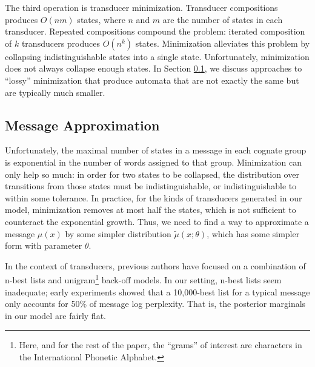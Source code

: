 \documentclass[11pt,a4paper]{article}
\begin{document}
The third operation is transducer minimization. Transducer compositions
produces $O(nm)$ states, where $n$ and $m$ are the number of states
in each transducer. Repeated compositions compound the problem:
iterated composition of $k$ transducers produces $O(n^k)$ states.
Minimization alleviates this problem by collapsing indistinguishable
states into a single state. Unfortunately, minimization does not
always collapse enough states. In Section \ref{sec:approx}, we discuss approaches
to ``lossy'' minimization that produce automata that are not exactly
the same but are typically much smaller.

\subsection{Message Approximation}
\label{sec:approx}

Unfortunately, the maximal number of states in a message in each
cognate group is exponential in the number of words assigned to
that group. Minimization can only help so much: in order for two
states to be collapsed, the distribution over transitions from those
states must be indistinguishable, or indistinguishable to within
some tolerance. In practice, for the kinds of transducers generated
in our model, minimization removes at most half the states, which
is not sufficient to counteract the exponential growth. Thus, we
need to find a way to approximate a message $\mu(x)$ by some simpler
distribution $\tilde\mu(x;\theta)$, which has some simpler form with
parameter $\theta$.

In the context of transducers, previous authors have focused on a
combination of n-best lists and unigram\footnote{Here, and for the
rest of the paper, the ``grams'' of interest are characters in the
International Phonetic Alphabet.} back-off models. \cite{dreyer2009graphical}
In our setting, n-best lists seem inadequate; early experiments
showed that a 10,000-best list for a typical message only accounts
for 50\% of message log perplexity. That is, the posterior marginals in
our model are fairly flat.
\end{document}
